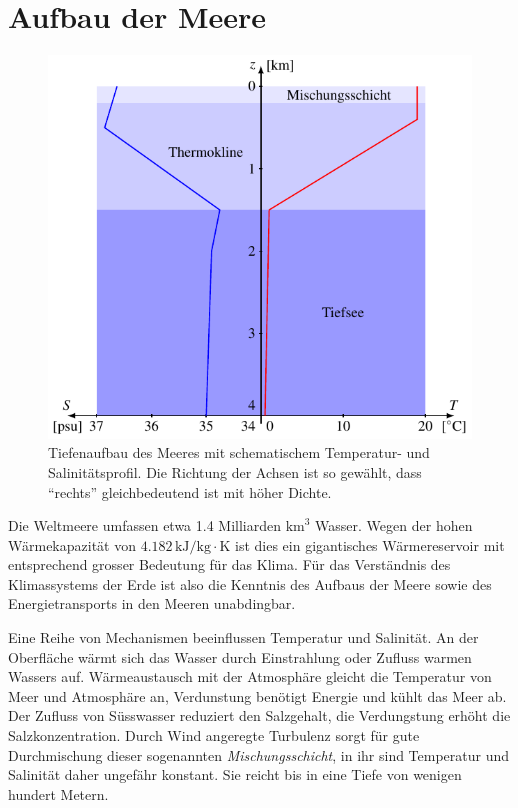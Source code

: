 %
%
%
\section{Aufbau der Meere\label{section:thc:schichtung}}
\begin{figure}
\centering
\includegraphics{chapters/4/schichten.pdf}
\caption{Tiefenaufbau des Meeres mit schematischem
Temperatur- und Salinitätsprofil.
Die Richtung der Achsen ist so gewählt, dass ``rechts'' gleichbedeutend
ist mit höher Dichte.
\label{skript:thc:schichtung}}
\end{figure}
Die Weltmeere umfassen etwa 1.4 Milliarden $\text{km}^3$ Wasser.
Wegen der hohen Wärmekapazität von $4.182\,\text{kJ}/\text{kg}\cdot\text{K}$
ist dies ein gigantisches Wärmereservoir mit entsprechend grosser
Bedeutung für das Klima.
Für das Verständnis des Klimassystems der Erde ist also die Kenntnis
des Aufbaus der Meere sowie des Energietransports in den Meeren unabdingbar.

Eine Reihe von Mechanismen beeinflussen Temperatur und Salinität.
An der Oberfläche wärmt sich das Wasser durch Einstrahlung
oder Zufluss warmen Wassers auf.
Wärmeaustausch mit der Atmosphäre gleicht die Temperatur von
Meer und Atmosphäre an, Verdunstung benötigt Energie und kühlt das Meer ab.
Der Zufluss von Süsswasser reduziert den Salzgehalt, die Verdungstung erhöht
die Salzkonzentration.
Durch Wind angeregte Turbulenz sorgt für gute Durchmischung dieser 
sogenannten {\em Mischungsschicht},
%
in ihr sind Temperatur und Salinität daher ungefähr konstant.
Sie reicht bis in eine Tiefe von wenigen hundert Metern.

